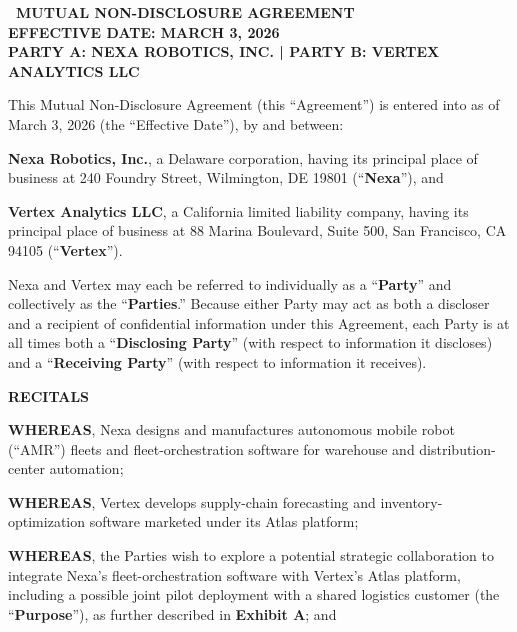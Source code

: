\thispagestyle{firstpage}

\begin{tcolorbox}[
  colback=mndabg,
  colframe=mndanavy,
  arc=0mm,
  leftrule=5pt,
  rightrule=0pt,
  toprule=0pt,
  bottomrule=0pt,
  boxsep=12pt,
  left=15pt,
  right=15pt,
  top=15pt,
  bottom=15pt
]
  {\fontsize{20}{24}\selectfont\color{mndanavy}\sffamily\bfseries \faLock\ MUTUAL NON-DISCLOSURE AGREEMENT}\\[8pt]
  {\fontsize{10}{14}\selectfont\color{mndaslate}\sffamily\bfseries EFFECTIVE DATE: MARCH 3, 2026}\\[4pt]
  {\fontsize{9}{12}\selectfont\color{mndateal}\sffamily\bfseries PARTY A: NEXA ROBOTICS, INC. \quad | \quad PARTY B: VERTEX ANALYTICS LLC}
\end{tcolorbox}

\vspace{1.5em}

This Mutual Non-Disclosure Agreement (this ``Agreement'') is entered into as of March 3, 2026 (the ``Effective Date''), by and between:

\textbf{Nexa Robotics, Inc.}, a Delaware corporation, having its principal place of business at 240 Foundry Street, Wilmington, DE 19801 (``\textbf{Nexa}''), and

\textbf{Vertex Analytics LLC}, a California limited liability company, having its principal place of business at 88 Marina Boulevard, Suite 500, San Francisco, CA 94105 (``\textbf{Vertex}'').

Nexa and Vertex may each be referred to individually as a ``\textbf{Party}'' and collectively as the ``\textbf{Parties}.'' Because either Party may act as both a discloser and a recipient of confidential information under this Agreement, each Party is at all times both a ``\textbf{Disclosing Party}'' (with respect to information it discloses) and a ``\textbf{Receiving Party}'' (with respect to information it receives).

\vspace{1.0em}
\centerline{\textbf{RECITALS}}
\vspace{0.5em}

\textbf{WHEREAS}, Nexa designs and manufactures autonomous mobile robot (``AMR'') fleets and fleet-orchestration software for warehouse and distribution-center automation;

\textbf{WHEREAS}, Vertex develops supply-chain forecasting and inventory-optimization software marketed under its Atlas platform;

\textbf{WHEREAS}, the Parties wish to explore a potential strategic collaboration to integrate Nexa's fleet-orchestration software with Vertex's Atlas platform, including a possible joint pilot deployment with a shared logistics customer (the ``\textbf{Purpose}''), as further described in \textbf{Exhibit A}; and

